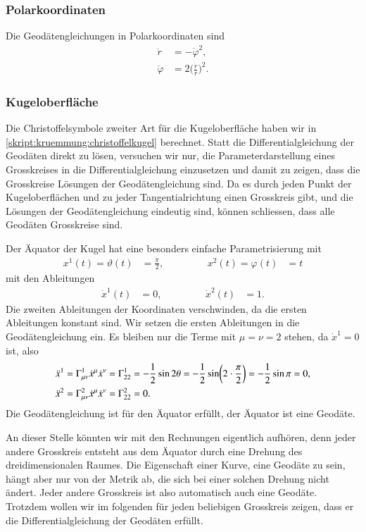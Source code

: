 \subsubsection{Polarkoordinaten}
Die Geodätengleichungen in Polarkoordinaten sind
\begin{align*}
\ddot r &= -\dot \varphi^2,
\\
\ddot \varphi &= 2\biggl(\frac{\dot r}{r}\biggr)^2.
\end{align*}

\subsubsection{Kugeloberfläche}
Die Christoffelsymbole zweiter Art für die Kugeloberfläche haben wir
in \eqref{skript:kruemmung:christoffelkugel} berechnet.
Statt die Differentialgleichung der Geodäten direkt zu lösen, versuchen
wir nur, die Parameterdarstellung eines Grosskreises in die
Differentialgleichung einzusetzen und damit zu zeigen, dass die
Grosskreise Lösungen der Geodätengleichung sind.
Da es durch jeden Punkt der Kugeloberflächen und zu jeder Tangentialrichtung
einen Grosskreis gibt, und die Lösungen der Geodätengleichung eindeutig
sind, können schliessen, dass alle Geodäten Grosskreise sind.

Der Äquator der Kugel hat eine besonders einfache Parametrisierung mit
\[
\begin{aligned}
x^1(t)=\vartheta(t)&=\frac{\pi}2,
&\qquad&&
x^2(t)=\varphi(t)&=t
\end{aligned}
\]
mit den Ableitungen
\[
\begin{aligned}
\dot x^1(t)&=0,
&\qquad&&
\dot x^2(t)&=1.
\end{aligned}
\]
Die zweiten Ableitungen der Koordinaten verschwinden, da die ersten
Ableitungen konstant sind.
Wir setzen die ersten Ableitungen in die Geodätengleichung ein.
Es bleiben nur die Terme mit $\mu=\nu=2$ stehen, da $\dot x^1=0$ ist,
also
\begin{align}
\ddot x^1
&=
\Gamma_{\mu\nu}^1\dot x^\mu\dot x^\nu=\Gamma_{22}^1=-\frac12\sin2\theta
=
-\frac12\sin\biggl( 2\cdot\frac{\pi}2\biggr)
=
-\frac12\sin\pi=0,
\label{skript:kruemmung:geodaete:breitenkreis}
\\
\ddot x^2
&=
\Gamma_{\mu\nu}^2\dot x^\mu\dot x^\nu=\Gamma_{22}^2=0.
\notag
\end{align}
Die Geodätengleichung ist für den Äquator erfüllt, der Äquator ist
eine Geodäte.

An dieser Stelle könnten wir mit den Rechnungen eigentlich aufhören, 
denn jeder andere Grosskreis entsteht aus dem Äquator durch eine
Drehung des dreidimensionalen Raumes.
Die Eigenschaft einer Kurve, eine Geodäte zu sein, hängt aber nur von
der Metrik ab, die sich bei einer solchen Drehung nicht ändert.
Jeder andere Grosskreis ist also automatisch auch eine Geodäte.
Trotzdem wollen wir im folgenden für jeden beliebigen Grosskreis
zeigen, dass er die Differentialgleichung der Geodäten erfüllt.

